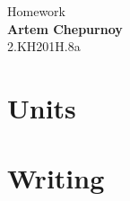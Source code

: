 \documentclass[a4paper,14pt,oneside,final]{extarticle}
\begin{document}
\begin{center}
{\LARGE Homework}\\[24pt]
{\large \textbf{Artem Chepurnoy}}\\[12pt]
{2.KH201{\scriptsize H}.8a}
\end{center}

\section*{Units}



\section*{Writing}






\end{document}
